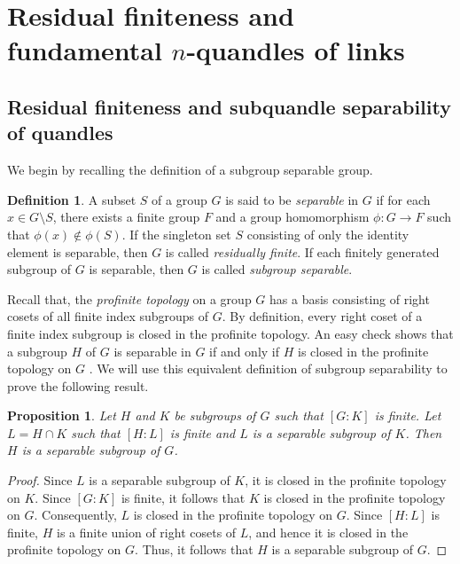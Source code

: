 \documentclass[12pt]{amsart}
\newtheorem{prop}[theorem]{Proposition}
\theoremstyle{definition}
\newtheorem{definition}[theorem]{Definition}
\numberwithin{equation}{subsection}
\begin{document}
\medskip



\section{Residual finiteness and fundamental $n$-quandles of links}\label{section 3}

\subsection{Residual finiteness and subquandle separability of quandles}
We begin by recalling the definition of a subgroup separable group.

\begin{definition}
A subset $S$ of a group $G$ is said to be {\it separable} in $G$ if for each $x \in G\setminus S$, there exists a finite group $F$ and a  group homomorphism $\phi: G \to F$ such that $\phi(x) \not\in \phi(S)$. If the singleton set $S$ consisting of only the identity element is separable, then $G$ is called {\it residually finite}. If each finitely generated subgroup of $G$ is separable, then $G$ is called {\it subgroup separable}. 
\end{definition}


Recall that, the {\it profinite topology} on a group $G$ has a basis consisting of right cosets of all finite index subgroups of $G$. By definition, every right coset of a finite index subgroup is closed in the profinite topology. An easy check shows that a subgroup $H$ of $G$ is separable in $G$ if and only if $H$ is closed in the profinite topology on $G$ \cite{MR2414358,MR1398726}. We will use this equivalent definition of subgroup separability to prove the following result.

\begin{prop}\label{finite index separable}
Let $H$ and $K$ be subgroups of $G$ such that $[G:K]$ is finite. Let $L=H \cap K$ such that $[H:L]$ is finite and $L$ is a separable subgroup of $K$. Then $H$ is a separable subgroup of $G$.
\end{prop}
\begin{proof}
Since $L$ is a separable subgroup of $K$,  it is closed in the profinite topology on $K$. Since $[G:K]$ is finite, it follows that $K$ is closed in the profinite topology on $G$. Consequently, $L$ is closed in the profinite topology on $G$. Since $[H:L]$ is finite,  $H$ is a finite union of right cosets of $L$, and hence it is closed in the profinite topology on $G$. Thus, it follows that $H$ is a separable subgroup of $G$.
\end{proof}
\end{document}
